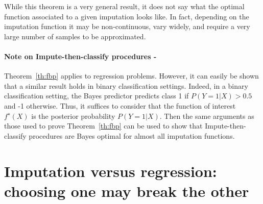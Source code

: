 \documentclass{article}
\newcommand{\Mcal}{\mathcal{M}}
\theoremstyle{plain}
\begin{document}
While this theorem is a very general result, it does not say what the optimal function associated to a given imputation looks like. In fact, depending on the imputation function it may be non-continuous, vary widely, and require a very large number of samples to be approximated.

\paragraph{Note on Impute-then-classify procedures -} Theorem~\ref{th:fbp} applies to regression problems. However, it can easily be shown that a similar result holds in binary classification settings. Indeed, in a binary classification setting, the Bayes predictor predicts class 1 if $P(Y=1|X)>0.5$ and -1 otherwise. Thus, it suffices to consider that the function of interest $f^\star(X)$ is the posterior probability $P(Y=1|X)$. Then the same arguments as those used to prove Theorem~\ref{th:fbp} can be used to show that Impute-then-classify procedures are Bayes optimal for almost all imputation functions. 




\section{Imputation versus regression: choosing one may break the other}
\end{document}
